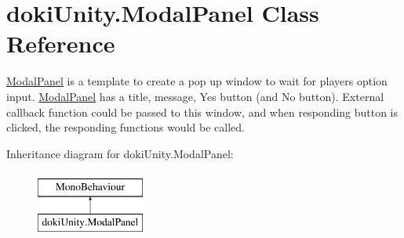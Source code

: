 \hypertarget{classdoki_unity_1_1_modal_panel}{}\section{doki\+Unity.\+Modal\+Panel Class Reference}
\label{classdoki_unity_1_1_modal_panel}


\hyperlink{classdoki_unity_1_1_modal_panel}{Modal\+Panel} is a template to create a pop up window to wait for player\textquotesingle{}s option input. \hyperlink{classdoki_unity_1_1_modal_panel}{Modal\+Panel} has a title, message, Yes button (and No button). External callback function could be passed to this window, and when responding button is clicked, the responding functions would be called.  


Inheritance diagram for doki\+Unity.\+Modal\+Panel\+:\begin{figure}[H]
\begin{center}
\leavevmode
\includegraphics[height=2.000000cm]{classdoki_unity_1_1_modal_panel}
\end{center}
\end{figure}
